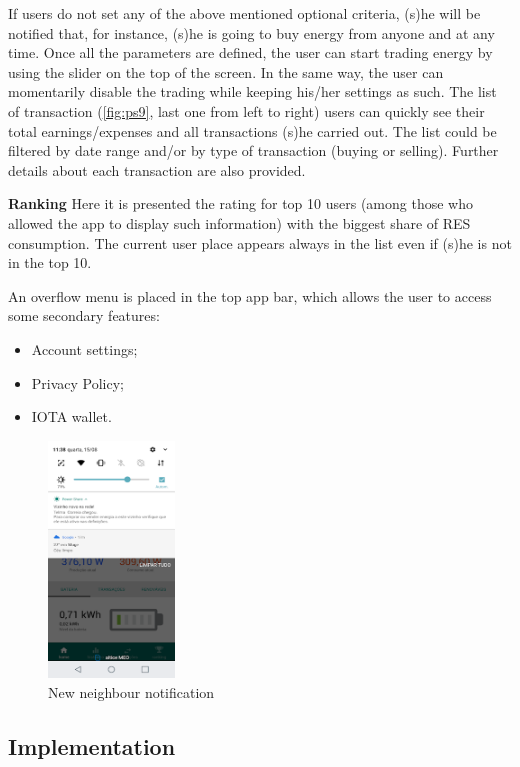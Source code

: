 If users do not set any of the above mentioned optional criteria, (s)he will be notified that, for instance, (s)he is going to buy energy from anyone and at any time. Once all the parameters are defined, the user can start trading energy by using the slider on the top of the screen. In the same way, the user can momentarily disable the trading while keeping his/her settings as such.
The list of transaction (\cref{fig:ps9}, last one from left to right) users can quickly see their total earnings/expenses and all transactions (s)he carried out.  The list could be filtered by date range and/or by type of transaction (buying or selling). Further details about each transaction are also provided.  



\textbf{Ranking}
Here it is presented the rating for top 10 users (among those who allowed the app to display such information) with the biggest share of RES consumption. The current user place appears always in the list even if (s)he is not in the top 10.

An overflow menu is placed in the top app bar, which allows the user to access some secondary features:
\begin{itemize}
    \item Account settings;
    \item Privacy Policy;
    \item IOTA wallet.
\end{itemize}


\begin{figure}[h]
\centering
\includegraphics[width=0.3\textwidth]{./Images/ps10}
\caption{New neighbour notification}
\label{fig:ps10}
\end{figure}

\subsection{Implementation}

